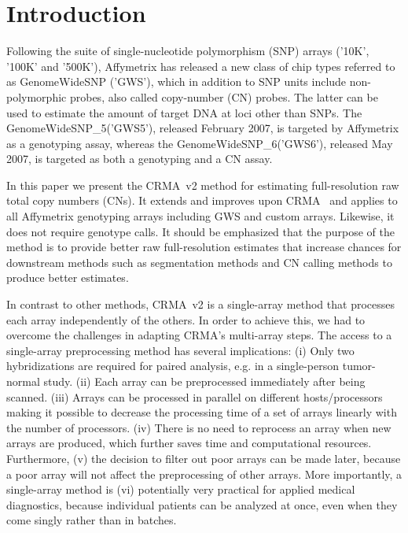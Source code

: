 \documentclass{bioinfo}
\newcommand{\GWS}{GWS\xspace}
\newcommand{\GWSFive}{GWS5\xspace}
\newcommand{\GWSSix}{GWS6\xspace}
\newcommand{\GWSFivef}{GenomeWideSNP\_5\xspace}
\newcommand{\GWSSixf}{GenomeWideSNP\_6\xspace}
\begin{document}
\section{Introduction}
\label{secBackground}
Following the suite of single-nucleotide polymorphism (SNP) arrays ('10K', '100K' and '500K'), Affymetrix has released a new class of chip types referred to as GenomeWideSNP ('GWS'), which in addition to SNP units include non-polymorphic probes, also called copy-number (CN) probes.  The latter can be used to estimate the amount of target DNA at loci other than SNPs.  The \GWSFivef ('\GWSFive'), released February 2007, is targeted by Affymetrix as a genotyping assay, whereas the \GWSSixf ('\GWSSix'), released May 2007, is targeted as both a genotyping and a CN assay.

In this paper we present the CRMA~v2 method for estimating full-resolution raw total copy numbers (CNs).  It extends and improves upon CRMA~\citep{BengtssonH_etal_2008} and applies to all Affymetrix genotyping arrays including \GWS and custom arrays. Likewise, it does not require genotype calls.  
It should be emphasized that the purpose of the method is to provide better raw full-resolution estimates that increase chances for downstream methods such as segmentation methods and CN calling methods to produce better estimates.

In contrast to other methods, CRMA~v2 is a single-array method that processes each array independently of the others.  In order to achieve this, we had to overcome the challenges in adapting CRMA's multi-array steps.
The access to a single-array preprocessing method has several implications: (i) Only two hybridizations are required for paired analysis, e.g. in a single-person tumor-normal study. (ii) Each array can be preprocessed immediately after being scanned.  (iii) Arrays can be processed in parallel on different hosts/processors making it possible to decrease the processing time of a set of arrays linearly with the number of processors.  (iv) There is no need to reprocess an array when new arrays are produced, which further saves time and computational resources.   Furthermore, (v) the decision to filter out poor arrays can be made later, because a poor array will not affect the preprocessing of other arrays. %
More importantly, a single-array method is (vi) potentially very practical for applied medical diagnostics, because individual patients can be analyzed at once, even when they come singly rather than in batches.
\end{document}
